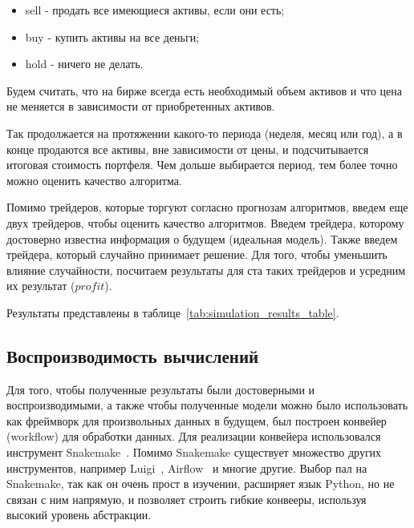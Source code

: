 \documentclass[a4paper,article,14pt]{extarticle}
\begin{document}
\begin{itemize}
    \item sell - продать все имеющиеся активы, если они есть;
    \item buy - купить активы на все деньги;
    \item hold - ничего не делать.
\end{itemize}

Будем считать, что на бирже всегда есть необходимый объем активов и что цена не меняется в зависимости от приобретенных активов.
\par

Так продолжается на протяжении какого-то периода (неделя, месяц или год), а в конце продаются все активы, вне зависимости от цены, и подсчитывается итоговая стоимость портфеля.
Чем дольше выбирается период, тем более точно можно оценить качество алгоритма.
\par

Помимо трейдеров, которые торгуют согласно прогнозам алгоритмов, введем еще двух трейдеров, чтобы оценить качество алгоритмов.
Введем трейдера, которому достоверно известна информация о будущем (идеальная модель).
Также введем трейдера, который случайно принимает решение.
Для того, чтобы уменьшить влияние случайности, посчитаем результаты для ста таких трейдеров и усредним их результат ($profit$).

Результаты представлены в таблице~\ref{tab:simulation_results_table}.


\subsection{Воспроизводимость вычислений}

Для того, чтобы полученные результаты были достоверными и воспроизводимыми, а также чтобы полученные модели можно было использовать как фреймворк для произвольных данных в будущем, был построен конвейер (workflow) для обработки данных.
Для реализации конвейера использовался инструмент Snakemake~\cite{snakemake}.
Помимо Snakemake существует множество других инструментов, например Luigi~\cite{luigi}, Airflow~\cite{airflow} и многие другие.
Выбор пал на Snakemake, так как он очень прост в изучении, расширяет язык Python, но не связан с ним напрямую, и позволяет строить гибкие конвееры, используя высокий уровень абстракции.
\par
\end{document}

